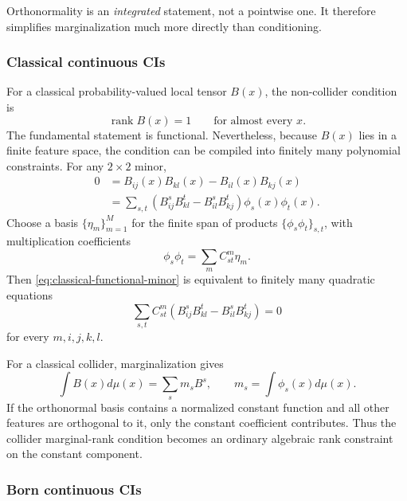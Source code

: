\documentclass[11pt]{article}
\theoremstyle{remark}
\newcommand{\rank}{\operatorname{rank}}
\begin{document}
Orthonormality is an \emph{integrated} statement, not a pointwise one. It therefore simplifies marginalization much more directly than conditioning.

\subsubsection{Classical continuous CIs}

For a classical probability-valued local tensor $B(x)$, the non-collider condition is
\begin{equation}
\rank B(x)=1\qquad\text{for almost every }x.
\label{eq:continuous-classical-chain}
\end{equation}
The fundamental statement is functional. Nevertheless, because $B(x)$ lies in a finite feature space, the condition can be compiled into finitely many polynomial constraints. For any $2\times2$ minor,
\begin{align}
0&=B_{ij}(x)B_{kl}(x)-B_{il}(x)B_{kj}(x)\nonumber\\
&=\sum_{s,t}
\left(B^s_{ij}B^t_{kl}-B^s_{il}B^t_{kj}\right)
\phi_s(x)\phi_t(x).
\label{eq:classical-functional-minor}
\end{align}
Choose a basis $\{\eta_m\}_{m=1}^M$ for the finite span of products $\{\phi_s\phi_t\}_{s,t}$, with multiplication coefficients
\begin{equation}
\phi_s\phi_t=\sum_m C^m_{st}\eta_m.
\end{equation}
Then \cref{eq:classical-functional-minor} is equivalent to finitely many quadratic equations
\begin{equation}
\sum_{s,t}C^m_{st}
\left(B^s_{ij}B^t_{kl}-B^s_{il}B^t_{kj}\right)=0
\end{equation}
for every $m,i,j,k,l$.

For a classical collider, marginalization gives
\begin{equation}
\int B(x)d\mu(x)=\sum_s m_s B^s,\qquad m_s=\int\phi_s(x)d\mu(x).
\end{equation}
If the orthonormal basis contains a normalized constant function and all other features are orthogonal to it, only the constant coefficient contributes. Thus the collider marginal-rank condition becomes an ordinary algebraic rank constraint on the constant component.

\subsubsection{Born continuous CIs}
\end{document}
